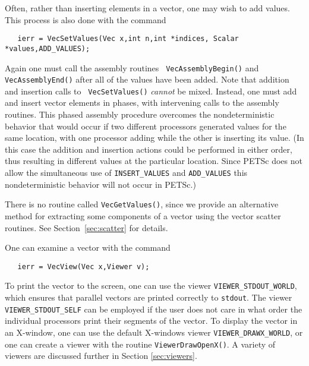 Often, rather than inserting elements in a vector, one may wish to 
add values. This process 
is also done with the command 
\begin{verbatim}
   ierr = VecSetValues(Vec x,int n,int *indices, Scalar *values,ADD_VALUES);
\end{verbatim}
Again  one must call the assembly routines {\tt
VecAssemblyBegin()} and {\tt VecAssemblyEnd()} after all of the values
have been added.  Note that addition and insertion calls to {\tt
VecSetValues()} {\em cannot} be mixed.  Instead, one must add and insert
vector elements in phases, with intervening calls to the assembly
routines. This phased assembly procedure overcomes the nondeterministic
behavior that
would occur if two different processors generated values
for the same location, with one processor adding while the other is inserting
its value.  (In this case the addition and insertion actions could be performed 
in either order,
thus resulting in different values at the particular location. Since
PETSc does not allow the simultaneous use of {\tt INSERT\_VALUES} and
{\tt ADD\_VALUES} this nondeterministic behavior will not occur in PETSc.)

There is no routine called {\tt VecGetValues()}, since we provide 
an alternative method for extracting some components of a vector using
the vector scatter routines.  See Section~\ref{sec:scatter} for details.

One can examine a vector with the command 
\begin{verbatim}
   ierr = VecView(Vec x,Viewer v);
\end{verbatim}
To print the vector to the screen, one can use the viewer
 {\tt VIEWER\_STDOUT\_WORLD}, which ensures
that parallel vectors are printed correctly to {\tt stdout}.  The
viewer {\tt VIEWER\_STDOUT\_SELF}  
can be employed if
the user does not care in what order the individual processors print
their segments of the vector.  To display the vector in an X-window,
one can use the default X-windows viewer {\tt VIEWER\_DRAWX\_WORLD},
or one can create a viewer with the routine {\tt ViewerDrawOpenX()}.
A variety of viewers are discussed further in Section \ref{sec:viewers}.

